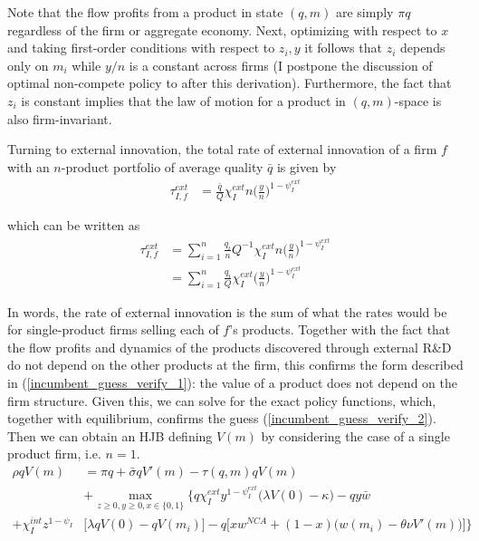 \documentclass[12pt,english]{article}
\theoremstyle{remark}
\begin{document}
Note that the flow profits from a product in state $(q,m)$ are simply $\pi q$ regardless of the firm or aggregate economy. Next, optimizing with respect to $x$ and taking first-order conditions with respect to $z_i,y$ it follows that $z_i$ depends only on $m_i$ while $y / n$ is a constant across firms (I postpone the discussion of optimal non-compete policy to after this derivation). Furthermore, the fact that $z_i$ is constant implies that the law of motion for a product in $(q,m)$-space is also firm-invariant.

Turning to external innovation, the total rate of external innovation of a firm $f$ with an $n$-product portfolio of average quality $\bar{q}$ is given by
\begin{align}
	\tau_{I,f}^{ext} &= \frac{\bar{q}}{Q} \chi_I^{ext} n \Big(\frac{y}{n}\Big)^{1-\psi_I^{ext}}   
\end{align}

which can be written as
\begin{align}
	\tau_{I,f}^{ext} &=  \sum_{i = 1}^n \frac{q_i}{n} Q^{-1} \chi_I^{ext} n \Big(\frac{y}{n}\Big)^{1-\psi_I^{ext}}  \\
	&= \sum_{i = 1}^n \frac{q_i}{Q} \chi_I^{ext} \Big(\frac{y}{n}\Big)^{1-\psi_I^{ext}}  
\end{align}

In words, the rate of external innovation is the sum of what the rates would be for single-product firms selling each of $f$'s products. Together with the fact that the flow profits and dynamics of the products discovered through external R\&D do not depend on the other products at the firm, this confirms the form described in (\ref{incumbent_guess_verify_1}): the value of a product does not depend on the firm structure. Given this, we can solve for the exact policy functions, which, together with equilibrium, confirms the guess (\ref{incumbent_guess_verify_2}). Then we can obtain an HJB defining $V(m)$ by considering the case of a single product firm, i.e. $n = 1$. 
\begin{align}
	\rho q V(m) &= \pi q + \bar{\sigma} q V'(m)  - \tau(q,m) q V(m) \nonumber \\ 
	& + \max_{z \ge 0, y \ge 0, x \in \{0,1\}} \Bigg\{ q \chi_I^{ext} y^{1-\psi_I^{ext}} \Big( \lambda V(0) - \kappa \Big) - q y \bar{w} \nonumber \\
	+  \chi_I^{int} z^{1-\psi_I} &\Bigg[ \lambda q V(0) - q V(m_i) \Bigg] - q \Bigg[ x w^{NCA} + (1-x) \Big( w(m_i) - \theta \nu V'(m)\Big) \Bigg] \Bigg\} \label{HJB_I_singleProductFirm_1}
\end{align}
\end{document}
